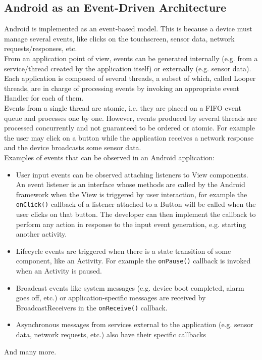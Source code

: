 \documentclass[11pt,a4paper,notitlepage]{article}
\begin{document}
\subsection{Android as an Event-Driven Architecture}
Android is implemented as an event-based model. This is because a device must manage several events, like clicks on the touchscreen, sensor data, network requests/responses, etc.\smallskip \\
From an application point of view, events can be generated internally (e.g. from a service/thread created by the application itself) or externally (e.g. sensor data). Each application is composed of several threads, a subset of which, called Looper threads, are in charge of processing events by invoking an appropriate event Handler for each of them.\smallskip \\
Events from a single thread are atomic, i.e. they are placed on a FIFO event queue and processes one by one. However, events produced by several threads are processed concurrently and not guaranteed to be ordered or atomic. For example the user may click on a button while the application receives a network response and the device broadcasts some sensor data.\smallskip \\
Examples of events that can be observed in an Android application:
\begin{itemize}
	\item User input events can be observed attaching listeners to View components. An event listener is an interface whose methods are called by the Android framework when the View is triggered by user interaction, for example the \texttt{onClick()} callback of a listener attached to a Button will be called when the user clicks on that button. The developer can then implement the callback to perform any action in response to the input event generation, e.g. starting another activity.
	\item Lifecycle events are triggered when there is a state transition of some component, like an Activity. For example the \texttt{onPause()} callback is invoked when an Activity is paused.
	\item Broadcast events like system messages (e.g. device boot completed, alarm goes off, etc.) or application-specific messages are received by BroadcastReceivers in the \texttt{onReceive()} callback.
	\item Asynchronous messages from services external to the application (e.g. sensor data, network requests, etc.) also have their specific callbacks 
\end{itemize}
And many more.
\end{document}
